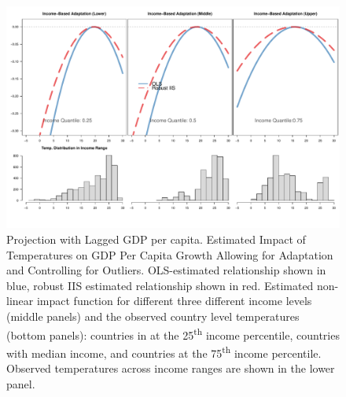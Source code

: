 \documentclass[11pt, letterpaper]{article}
\numberwithin{algorithm}{section}
\numberwithin{assumption}{section}
\numberwithin{lemma}{section}
\numberwithin{theorem}{section}
\numberwithin{corollary}{section}
\numberwithin{remark}{section}
\numberwithin{equation}{section}
\numberwithin{figure}{section}
\numberwithin{table}{section}
\begin{document}
\begin{figure}[!htbp]  %
\centering
\includegraphics[width = \textwidth]{eff.adapt.L1.pdf}
\caption{Projection with Lagged GDP per capita. Estimated Impact of Temperatures on GDP Per Capita Growth Allowing for Adaptation and Controlling for Outliers. OLS-estimated relationship shown in blue, robust IIS estimated relationship shown in red. Estimated non-linear impact function for different three different income levels (middle panels) and the observed country level temperatures (bottom panels): countries in at the 25\textsuperscript{th} income percentile, countries with median income, and countries at the 75\textsuperscript{th} income percentile. Observed temperatures across income ranges are shown in the lower panel. }
\label{fig_dist_app1}
\end{figure}
\end{document}
